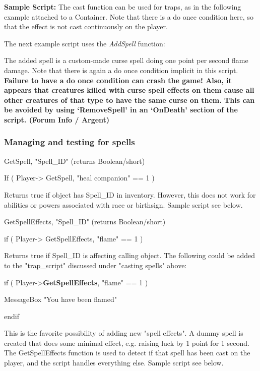 \textbf{Sample Script:} The cast function can be used for traps, as in
the following example attached to a Container. Note that there is a do
once condition here, so that the effect is not cast continuously on the
player.



The next example script uses the \emph{AddSpell} function:



The added spell is a custom-made curse spell doing one point per second
flame damage. Note that there is again a do once condition implicit in
this script. \textbf{Failure to have a do once condition can crash the
game! Also, it appears that creatures killed with curse spell effects on
them cause all other creatures of that type to have the same curse on
them. This can be avoided by using `RemoveSpell' in an `OnDeath' section
of the script. (Forum Info / Argent)}

\hypertarget{managing-and-testing-for-spells}{%
\subsubsection{Managing and testing for
spells}\label{managing-and-testing-for-spells}}

GetSpell, "Spell\_ID" (returns Boolean/short)

If ( Player-> GetSpell, "heal companion" == 1 )

Returns true if object has Spell\_ID in inventory. However, this does
not work for abilities or powers associated with race or birthsign.
Sample script see below.

GetSpellEffects, "Spell\_ID" (returns Boolean/short)

if ( Player-> GetSpellEffects, "flame" == 1 )

Returns true if Spell\_ID is affecting calling object. The following
could be added to the "trap\_script" discussed under "casting spells"
above:

if ( Player->\textbf{GetSpellEffects}, "flame" == 1 )

MessageBox "You have been flamed"

endif

This is the favorite possibility of adding new "spell effects". A dummy
spell is created that does some minimal effect, e.g. raising luck by 1
point for 1 second. The GetSpellEffects function is used to detect if
that spell has been cast on the player, and the script handles
everything else. Sample script see below.

